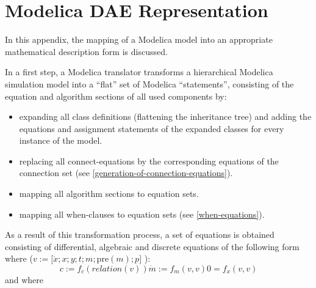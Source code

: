 \chapter{Modelica DAE Representation}

In this appendix, the mapping of a Modelica model into an appropriate
mathematical description form is discussed.

In a first step, a Modelica translator transforms a hierarchical
Modelica simulation model into a ``flat'' set of Modelica
``statements'', consisting of the equation and algorithm sections of all
used components by:
\begin{itemize}
\item
  expanding all class definitions (flattening the inheritance tree) and
  adding the equations and assignment statements of the expanded classes
  for every instance of the model.
\item
  replacing all connect-equations by the corresponding equations of the
  connection set (see \autoref{generation-of-connection-equations}).
\item
  mapping all algorithm sections to equation sets.
\item
  mapping all when-clauses to equation sets (see \autoref{when-equations}).
\end{itemize}

As a result of this transformation process, a set of equations is
obtained consisting of differential, algebraic and discrete equations of
the following form where ($v:=\lbrack \dot{x}; x; y; t; m; \text{pre}(m); p\rbrack$ ):
\begin{subequations}
\begin{equation}
c:=f_c(relation(v))\label{eq:crossing}
\end{equation}
\begin{equation}
\dot{m}:=f_m(v, v)
\end{equation}
\begin{equation}
0=f_x(v, v)\label{eq:dae}
\end{equation}
\label{eq:hydrid-dae}
\end{subequations}
and where

